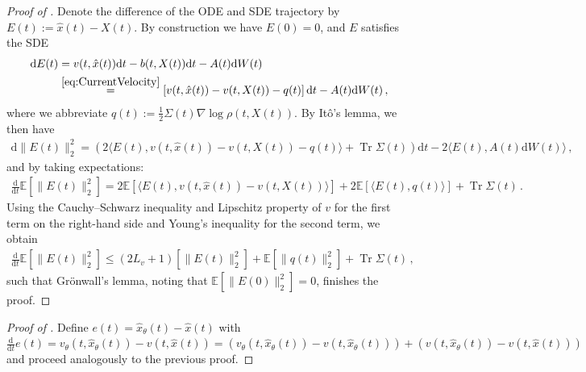 \documentclass[oneside,11pt]{article}
\theoremstyle{remark}
\DeclareMathOperator{\Tr}{Tr}
\begin{document}
\begin{proof}[Proof of ]
Denote the difference of the ODE and SDE trajectory by $E(t) := \hat{x}(t) - X(t)$. By construction we have $E(0) = 0$, and $E$ satisfies the SDE
\begin{align*}
    \mathrm{d} E(t) &= v(t, \hat{x}(t)) \mathrm{d}t - b(t, X(t)) \mathrm{d}t - A(t) \mathrm{d}W(t)\\
    &\overset{\eqref{eq:CurrentVelocity}}{=} \left[v(t, \hat{x}(t)) - v(t, X(t)) - q(t) \right] \mathrm{d}t - A(t) \mathrm{d}W(t)\,,
\end{align*}
where we abbreviate $q(t) := \tfrac12 \Sigma(t) \nabla \log \rho(t, X(t))$. By It{\^o}'s lemma, we then have
\begin{align*}
    \mathrm{d} \lVert E(t) \rVert_2^2 = \left( 2 \langle E(t), v(t, \hat{x}(t)) - v(t, X(t)) - q(t) \rangle + \Tr \Sigma(t) \right) \mathrm{d}t - 2 \langle E(t), A(t) \mathrm{d} W(t) \rangle\,,
\end{align*}
and by taking expectations:
\begin{align*}
    \frac{\mathrm{d}}{\mathrm{d}t} \mathbb{E} \left[\lVert E(t) \rVert_2^2 \right] = 2 \mathbb{E} \left[\langle E(t), v(t, \hat{x}(t)) - v(t, X(t)) \rangle \right] + 2 \mathbb{E} \left[\langle E(t), q(t) \rangle \right] + \Tr \Sigma(t)\,.
\end{align*}
Using the Cauchy--Schwarz inequality and Lipschitz property of $v$ for the first term on the right-hand side and Young's inequality for the second term, we obtain
\begin{align*}
     \frac{\mathrm{d}}{\mathrm{d}t} \mathbb{E} \left[\lVert E(t) \rVert_2^2 \right] \leq (2 L_v + 1) \left[\lVert E(t) \rVert_2^2 \right] + \mathbb{E} \left[\lVert q(t) \rVert_2^2 \right] + \Tr \Sigma(t)\,,
\end{align*}
such that Gr{\"o}nwall's lemma, noting  that $\mathbb{E} \left[\lVert E(0) \rVert_2^2 \right] = 0$, finishes the proof.
\end{proof}

\begin{proof}[Proof of ]
Define $e(t) = \hat{x}_{\theta}(t) - \hat{x}(t)$ with $\frac{\mathrm{d}}{\mathrm{d}t} e(t) = v_\theta(t, \hat{x}_{\theta}(t)) - v(t, \hat{x}(t)) = (v_\theta(t, \hat{x}_{\theta}(t)) - v(t, \hat{x}_{\theta}(t))) + (v(t, \hat{x}_{\theta}(t)) -  v(t, \hat{x}(t)))$ and proceed analogously to the previous proof.
\end{proof}
\end{document}

